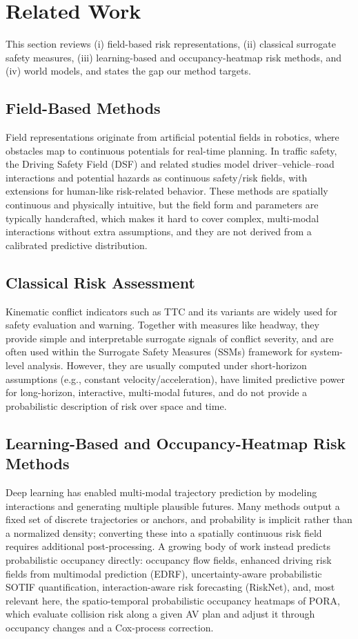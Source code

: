 \documentclass[journal]{IEEEtran}
\begin{document}
\section{Related Work}\label{section:related_work}
This section reviews (i) field-based risk representations, (ii) classical surrogate safety measures, (iii) learning-based and occupancy-heatmap risk methods, and (iv) world models, and states the gap our method targets.

\subsection{Field-Based Methods}\label{sec:rw_field_based}
Field representations originate from artificial potential fields in robotics, where obstacles map to continuous potentials for real-time planning. In traffic safety, the Driving Safety Field (DSF) and related studies model driver--vehicle--road interactions and potential hazards as continuous safety/risk fields, with extensions for human-like risk-related behavior. These methods are spatially continuous and physically intuitive, but the field form and parameters are typically handcrafted, which makes it hard to cover complex, multi-modal interactions without extra assumptions, and they are not derived from a calibrated predictive distribution.

\subsection{Classical Risk Assessment}\label{sec:rw_classical}
Kinematic conflict indicators such as TTC and its variants are widely used for safety evaluation and warning. Together with measures like headway, they provide simple and interpretable surrogate signals of conflict severity, and are often used within the Surrogate Safety Measures (SSMs) framework for system-level analysis. However, they are usually computed under short-horizon assumptions (e.g., constant velocity/acceleration), have limited predictive power for long-horizon, interactive, multi-modal futures, and do not provide a probabilistic description of risk over space and time.

\subsection{Learning-Based and Occupancy-Heatmap Risk Methods}\label{sec:rw_multimodal}
Deep learning has enabled multi-modal trajectory prediction by modeling interactions and generating multiple plausible futures. Many methods output a fixed set of discrete trajectories or anchors, and probability is implicit rather than a normalized density; converting these into a spatially continuous risk field requires additional post-processing. A growing body of work instead predicts probabilistic occupancy directly: occupancy flow fields, enhanced driving risk fields from multimodal prediction (EDRF), uncertainty-aware probabilistic SOTIF quantification, interaction-aware risk forecasting (RiskNet), and, most relevant here, the spatio-temporal probabilistic occupancy heatmaps of PORA, which evaluate collision risk along a given AV plan and adjust it through occupancy changes and a Cox-process correction.
\end{document}
